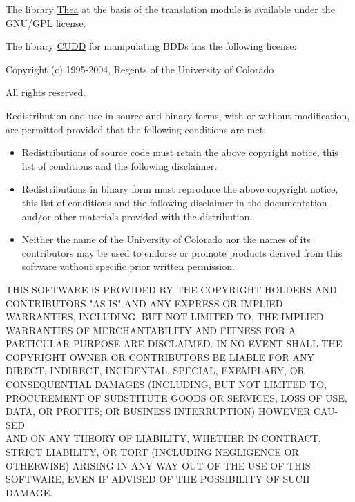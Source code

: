 \documentclass[a4paper,10pt]{scrartcl}
\begin{document}
The library \href{http://vangelisv.github.io/thea/}{Thea} at the basis of the translation module is available under the \href{http://www.gnu.org/copyleft/gpl.html}{GNU/GPL license}.

The library \href{http://vlsi.colorado.edu/\string ~fabio/}{CUDD} for manipulating BDDs has the following license:

\vspace{3mm}

Copyright (c) 1995-2004, Regents of the University of Colorado

All rights reserved.

Redistribution and use in source and binary forms, with or without
modification, are permitted provided that the following conditions
are met:

\begin{itemize}
\item
Redistributions of source code must retain the above copyright
notice, this list of conditions and the following disclaimer.
\item
Redistributions in binary form must reproduce the above copyright
notice, this list of conditions and the following disclaimer in the
documentation and/or other materials provided with the distribution.
\item
Neither the name of the University of Colorado nor the names of its
contributors may be used to endorse or promote products derived from
this software without specific prior written permission.
\end{itemize}
THIS SOFTWARE IS PROVIDED BY THE COPYRIGHT HOLDERS AND CONTRIBUTORS
"AS IS" AND ANY EXPRESS OR IMPLIED WARRAN\-TIES, INCLUDING, BUT NOT
LIMITED TO, THE IMPLIED WARRANTIES OF MERCHANTABILITY AND FITNESS
FOR A PARTICULAR PURPOSE ARE DISCLAIMED. IN NO EVENT SHALL THE
COPYRIGHT OWNER OR CONTRIBUTORS BE LIABLE FOR ANY DIRECT, INDIRECT,
INCIDENTAL, SPECIAL, EXEMPLARY, OR CONSEQUENTIAL DAMAGES (INCLUDING,
BUT NOT LIMITED TO, PROCUREMENT OF SUBSTITUTE GOODS OR SERVICES;
LOSS OF USE, DATA, OR PROFITS; OR BUSINESS INTERRUPTION) HOWEVER
CAU-SED
\\ AND ON ANY THEORY OF LIABILITY, WHETHER IN CONTRACT, STRICT
LIABILITY, OR TORT (INCLUDING NEGLIGENCE OR OTHERWISE) ARISING IN
ANY WAY OUT OF THE USE OF THIS SOFTWARE, EVEN IF ADVISED OF THE
POSSIBILITY OF SUCH DAMAGE.




\end{document}
